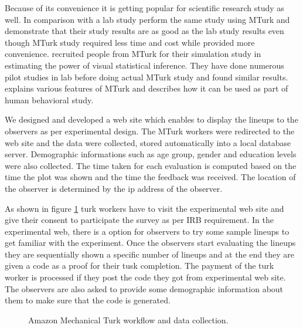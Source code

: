 \documentclass[11pt]{article}
\begin{document}
Because of its convenience it is getting popular for scientific research study as well. In comparison with a lab study \cite{suri:2010} perform the same study using MTurk and demonstrate that their study results are as good as the lab study results even though MTurk study required less time and cost while provided more convenience. \cite{majumder:2013} recruited people from MTurk for their simulation study in estimating the power of visual statistical inference. They have done numerous pilot studies in lab before doing actual MTurk study and found similar results. \cite{mason:2012} explains various features of MTurk and describes how it can be used as part of human behavioral study.

We designed and developed a web site which enables to display the lineups to the observers as per experimental design. The MTurk workers were redirected to the web site and the data were collected, stored automatically into a local database server. Demographic informations such as age group, gender and education levels were also collected. The time taken for each evaluation is computed based on the time the plot was shown and the time the feedback was received. The location of the observer is determined by the ip address of the observer.

As shown in figure \ref{fig:turk_work_flow} turk workers have to visit the experimental web site and give their consent to participate the survey as per IRB requirement. In the experimental web, there is a option for observers to try some sample lineups to get familiar with the experiment. Once the observers start evaluating the lineups they are sequentially shown a specific number of lineups and at the end they are given a code as a proof for their tusk completion. The payment of the turk worker is processed if they post the code they got from experimental web site. The observers are also asked to provide some demographic information about them to make sure that the code is generated.

\begin{figure}[htbp]
   \centering
       \caption{Amazon Mechanical Turk workflow and data collection.}
       \label{fig:turk_work_flow}
\end{figure}
\end{document}
